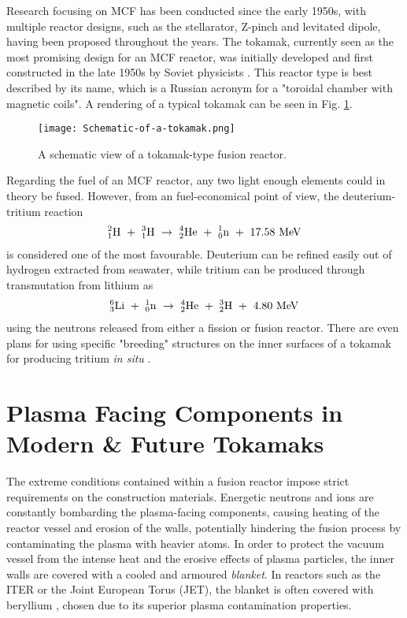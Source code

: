 Research focusing on MCF has been conducted since the early 1950s, with multiple reactor designs, such as the stellarator, Z-pinch and levitated dipole, having been proposed throughout the years. 
The tokamak, currently seen as the most promising design for an MCF reactor, was initially developed and first constructed in the late 1950s by Soviet physicists \cite{tokamakorigins}. 
This reactor type is best described by its name, which is a Russian acronym for a "toroidal chamber with magnetic coils".
A rendering of a typical tokamak can be seen in Fig. \ref{fig:tokamak}.

\begin{figure}[!ht]
\center
\texttt{[image: Schematic-of-a-tokamak.png]}
\caption{A schematic view of a tokamak-type fusion reactor.} 
\label{fig:tokamak}
\end{figure}

Regarding the fuel of an MCF reactor, any two light enough elements could in theory be fused. 
However, from an fuel-economical point of view, the deuterium-tritium reaction 
\begin{align}
^2_1\rm{H} ~+~ ^3_1\rm{H} ~\rightarrow~ ^4_2\rm{He} ~+~ ^1_0\rm{n} ~+~ 17.58 ~\rm{MeV}
\label{Eq:D-T-reaction}
\end{align}
is considered one of the most favourable. 
Deuterium can be refined easily out of hydrogen extracted from seawater, while tritium can be produced through transmutation from lithium as
\begin{align}
^6_3\rm{Li} ~+~ ^1_0\rm{n} ~\rightarrow~ ^4_2\rm{He} ~+~ ^3_2\rm{H} ~+~ 4.80  ~\rm{MeV}
\end{align}
using the neutrons released from either a fission or fusion reactor. 
There are even plans for using specific "breeding" structures on the inner surfaces of a tokamak for producing tritium \textit{in situ} \cite{giancarli2012overview}.


\section{Plasma Facing Components in Modern \& Future Tokamaks}

The extreme conditions contained within a fusion reactor impose strict requirements on the construction materials. 
Energetic neutrons and ions are constantly bombarding the plasma-facing components, causing heating of the reactor vessel and erosion of the walls, potentially hindering the fusion process by contaminating the plasma with heavier atoms. 
In order to protect the vacuum vessel from the intense heat and the erosive effects of plasma particles, the inner walls are covered with a cooled and armoured \textit{blanket}. 
In reactors such as the ITER or the Joint European Torus (JET), the blanket is often covered with beryllium \cite{raffray2012overview}, chosen due to its superior plasma contamination properties.

